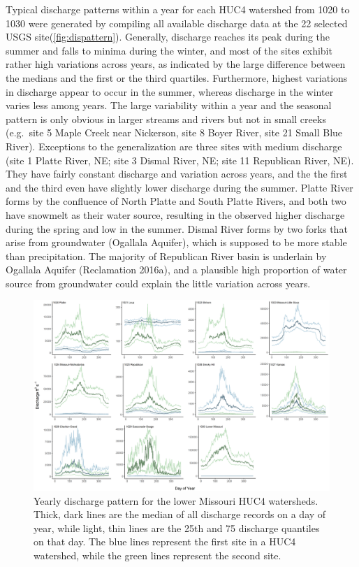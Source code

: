 \documentclass[12pt,]{article}
\makeatletter
\def\maxwidth{\ifdim\Gin@nat@width>\linewidth\linewidth\else\Gin@nat@width\fi}
\makeatother
\begin{document}
Typical discharge patterns within a year for each HUC4 watershed from
1020 to 1030 were generated by compiling all available discharge data at
the 22 selected USGS site(\autoref{fig:dispattern}). Generally,
discharge reaches its peak during the summer and falls to minima during
the winter, and most of the sites exhibit rather high variations across
years, as indicated by the large difference between the medians and the
first or the third quartiles. Furthermore, highest variations in
discharge appear to occur in the summer, whereas discharge in the winter
varies less among years. The large variability within a year and the
seasonal pattern is only obvious in larger streams and rivers but not in
small creeks (e.g.~site 5 Maple Creek near Nickerson, site 8 Boyer
River, site 21 Small Blue River). Exceptions to the generalization are
three sites with medium discharge (site 1 Platte River, NE; site 3
Dismal River, NE; site 11 Republican River, NE). They have fairly
constant discharge and variation across years, and the the first and the
third even have slightly lower discharge during the summer. Platte River
forms by the confluence of North Platte and South Platte Rivers, and
both two have snowmelt as their water source, resulting in the observed
higher discharge during the spring and low in the summer. Dismal River
forms by two forks that arise from groundwater (Ogallala Aquifer), which
is supposed to be more stable than precipitation. The majority of
Republican River basin is underlain by Ogallala Aquifer (Reclamation
2016a), and a plausible high proportion of water source from groundwater
could explain the little variation across years.

\begin{figure}
\includegraphics[width=\maxwidth]{../Figures/discharge} \caption{\label{fig:dispattern}Yearly discharge pattern for the lower Missouri HUC4 watersheds. Thick, dark lines are the median of all discharge records on a day of year, while light, thin lines are the 25th and 75 discharge quantiles on that day. The blue lines represent the first site in a HUC4 watershed, while the green lines represent the second site.}\label{fig:dispattern}
\end{figure}
\end{document}
